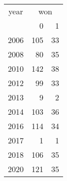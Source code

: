\footnotesize\begin{tabular}[t]{lrr}
\toprule
\multicolumn{1}{c}{year} & \multicolumn{2}{c}{won} \\
\cmidrule(l{3pt}r{3pt}){1-1} \cmidrule(l{3pt}r{3pt}){2-3}
  & 0 & 1\\
\midrule
2006 & 105 & 33\\
2008 & 80 & 35\\
2010 & 142 & 38\\
2012 & 99 & 33\\
2013 & 9 & 2\\
2014 & 103 & 36\\
2016 & 114 & 34\\
2017 & 1 & 1\\
2018 & 106 & 35\\
2020 & 121 & 35\\
\bottomrule
\end{tabular}

